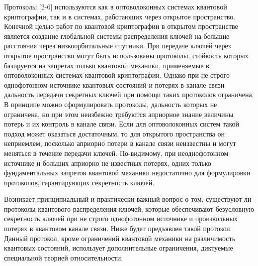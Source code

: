 Протоколы \cite{bib2} [2-6] используются как в оптоволоконных системах квантовой криптографии, так и в системах, работающих через открытое пространство.
Конечной целью работ по квантовой криптографии в открытом пространстве является создание глобальной системы распределения ключей на большие расстояния через низкоорбитальные спутники. 
При передаче ключей через открытое пространство могут быть использованы протоколы, стойкость которых базируется на запретах только квантовой механики, применяемые в оптоволоконных системах квантовой криптографии. 
Однако при не строго однофотонном источнике квантовых состояний и потерях в канале связи дальность передачи секретных ключей при помощи таких протоколов ограничена. 
В принципе можно сформулировать протоколы, дальность которых не ограничена, но при этом неизбежно требуются априорное знание величины потерь и их контроль в канале связи. 
Если для оптоволоконных систем такой подход может оказаться достаточным, то для открытого пространства он неприемлем, посколько априорно потери в канале связи неизвестны и могут меняться в течение передачи ключей. По-видимому, при неоднофотонном источнике и больших априорно не известных потерях, одних только фундаментальных запретов квантовой механики недостаточно для формулировки протоколов, гарантирующих секретность ключей.

Возникает принципиальный и практически важный вопрос о том, существуют ли протоколы квантового распределения ключей, которые обеспечивают безусловную секретность ключей при не строго 
однофотонном источнике и произвольных потерях в квантовом канале связи. Ниже будет предъявлен такой протокол. Данный протокол, кроме ограничений квантовой механики на различимость квантовых состояний, использует дополнительные ограничения, диктуемые специальной теорией относительности.

